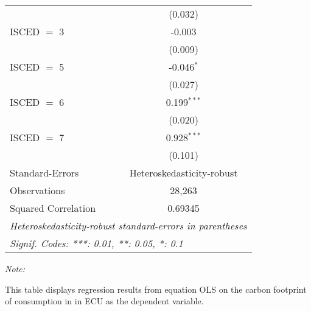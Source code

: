 \begin{table}[htbp!]
\begin{adjustbox}{width = 1\textwidth, max height = 0.95\textheight, center}
\begin{threeparttable}[b]
\begin{tabular}{lc}
                                & (0.032)\\   
            ISCED $=$ 3         & -0.003\\   
                                & (0.009)\\   
            ISCED $=$ 5         & -0.046$^{*}$\\   
                                & (0.027)\\   
            ISCED $=$ 6         & 0.199$^{***}$\\   
                                & (0.020)\\   
            ISCED $=$ 7         & 0.928$^{***}$\\   
                                & (0.101)\\   
            \midrule 
            Standard-Errors     & Heteroskedasticity-robust \\   
            Observations        & 28,263\\  
            Squared Correlation & 0.69345\\  
            \midrule \midrule
            \multicolumn{2}{l}{\emph{Heteroskedasticity-robust standard-errors in parentheses}}\\
            \multicolumn{2}{l}{\emph{Signif. Codes: ***: 0.01, **: 0.05, *: 0.1}}\\
         \end{tabular}
         
         \begin{tablenotes}\item \medskip \textit{Note:}
            \item This table displays regression results from equation OLS on the carbon footprint of consumption in  in ECU as the dependent variable.  
         \end{tablenotes}
      \end{threeparttable}
   \end{adjustbox}
\end{table}



